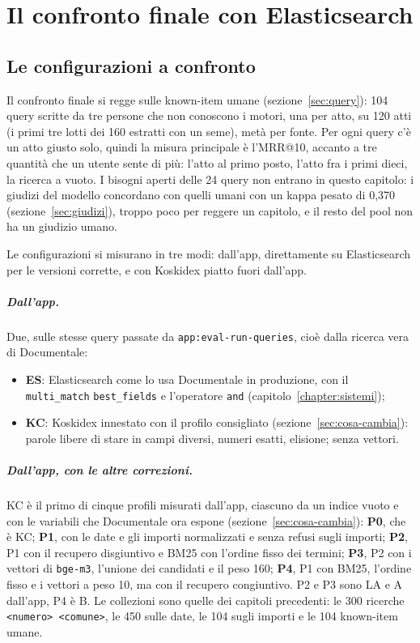 \chapter{Il confronto finale con Elasticsearch}\label{chapter:confronto}

\section{Le configurazioni a confronto}\label{sec:configurazioni}

Il confronto finale si regge sulle known-item umane
(sezione~\ref{sec:query}): 104 query scritte da tre persone che non
conoscono i motori, una per atto, su 120 atti (i primi tre lotti dei 160 estratti con un seme),
metà per fonte. Per ogni query c'è un atto giusto solo, quindi la misura
principale è l'MRR@10, accanto a tre quantità che un utente sente di più:
l'atto al primo posto, l'atto fra i primi dieci, la ricerca a vuoto. I bisogni
aperti delle 24 query non entrano in questo capitolo: i giudizi del modello
concordano con quelli umani con un kappa pesato di 0,370
(sezione~\ref{sec:giudizi}), troppo poco per reggere un capitolo, e il resto
del pool non ha un giudizio umano.

Le configurazioni si misurano in tre modi: dall'app, direttamente su
Elasticsearch per le versioni corrette, e con Koskidex piatto fuori dall'app.

\paragraph{Dall'app.} Due, sulle stesse query passate da
\texttt{app:eval-run-queries}, cioè dalla ricerca vera di Documentale:
\begin{itemize}
  \item \textbf{ES}: Elasticsearch come lo usa Documentale in produzione, con il
        \texttt{multi\_match} \texttt{best\_fields} e l'operatore
        \texttt{and} (capitolo~\ref{chapter:sistemi});
  \item \textbf{KC}: Koskidex innestato con il profilo consigliato
        (sezione~\ref{sec:cosa-cambia}): parole libere di stare in campi
        diversi, numeri esatti, elisione; senza vettori.
\end{itemize}

\paragraph{Dall'app, con le altre correzioni.} KC è il primo di cinque profili
misurati dall'app, ciascuno da un indice vuoto e con le variabili che
Documentale ora espone (sezione~\ref{sec:cosa-cambia}): \textbf{P0}, che è KC;
\textbf{P1}, con le date e gli importi normalizzati e senza refusi sugli
importi; \textbf{P2}, P1 con il recupero disgiuntivo e BM25 con l'ordine fisso
dei termini; \textbf{P3}, P2 con i vettori di \texttt{bge-m3}, l'unione dei
candidati e il peso 160; \textbf{P4}, P1 con BM25, l'ordine fisso e i vettori
a peso 10, ma con il recupero congiuntivo. P2 e P3 sono LA e A dall'app, P4 è
B. Le collezioni sono quelle dei capitoli precedenti: le 300 ricerche
\texttt{<numero> <comune>}, le 450 sulle date, le 104 sugli importi e le 104
known-item umane.

